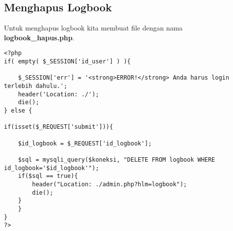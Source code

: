 \subsection{Menghapus Logbook}
Untuk menghapus logbook kita membuat file dengan nama \textbf{logbook\_hapus.php}.
\begin{lstlisting}
<?php
if( empty( $_SESSION['id_user'] ) ){

	$_SESSION['err'] = '<strong>ERROR!</strong> Anda harus login terlebih dahulu.';
	header('Location: ./');
	die();
} else {

if(isset($_REQUEST['submit'])){

    $id_logbook = $_REQUEST['id_logbook'];

    $sql = mysqli_query($koneksi, "DELETE FROM logbook WHERE id_logbook='$id_logbook'");
    if($sql == true){
        header("Location: ./admin.php?hlm=logbook");
        die();
    }
    }
}
?>
\end{lstlisting}

